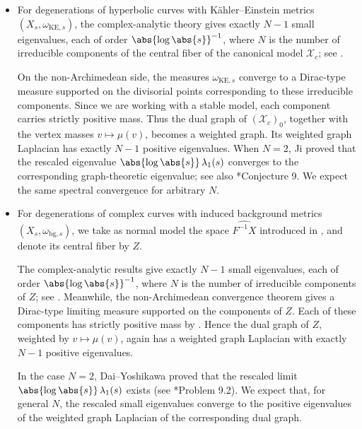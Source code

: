 \documentclass[12pt]{amsart}
\begin{document}
\begin{itemize}
    \item
    For degenerations of hyperbolic curves with K\"ahler--Einstein
    metrics $(X_s,\omega_{\mathrm{KE},s})$, the complex-analytic theory
    gives exactly $N-1$ small eigenvalues, each of order
    $\abs{\log\abs{s}}^{-1}$, where $N$ is the number of irreducible
    components of the central fiber of the canonical model
    $\mathcal{X}_c$; see .

    On the non-Archimedean side, the measures
    $\omega_{\mathrm{KE},s}$ converge to a Dirac-type measure supported
    on the divisorial points corresponding to these irreducible
    components. Since we are working with a stable model, each component
    carries strictly positive mass. Thus the dual graph of
    $(\mathcal{X}_c)_0$, together with the vertex masses
    $v \mapsto \mu(v)$, becomes a weighted graph. Its weighted graph
    Laplacian has exactly $N-1$ positive eigenvalues. When $N=2$, Ji
    \cite{Ji1993} proved that the rescaled eigenvalue
    $\abs{\log\abs{s}}\,\lambda_1(s)$ converges to the corresponding
    graph-theoretic eigenvalue; see also
    \cite{Grotowski-Huntley-Jorgenson2001}*{Conjecture 9}. We expect
    the same spectral convergence for arbitrary $N$.

    \item
    For degenerations of complex curves with induced background metrics
    $(X_s,\omega_{\mathrm{bg},s})$, we take as normal model the space
    $\widehat{F^{-1}X}$ introduced in , and
    denote its central fiber by $Z$.

    The complex-analytic results give exactly $N-1$ small eigenvalues,
    each of order $\abs{\log\abs{s}}^{-1}$, where $N$ is the number of
    irreducible components of $Z$; see .
    Meanwhile, the non-Archimedean convergence theorem gives a
    Dirac-type limiting measure supported on the components of $Z$.
    Each of these components has strictly positive mass by
    . Hence the dual graph of $Z$,
    weighted by $v \mapsto \mu(v)$, again has a weighted graph
    Laplacian with exactly $N-1$ positive eigenvalues.

    In the case $N=2$, Dai--Yoshikawa proved that 
    the
    rescaled limit 
    $\abs{\log\abs{s}}\,\lambda_1(s)$ exists (see 
    \cite{Dai-Yoshikawa2025}*{Problem 9.2}). We expect that, for general
    $N$, the rescaled small eigenvalues converge to the positive
    eigenvalues of the weighted graph Laplacian of the corresponding
    dual graph.


\end{itemize}
\end{document}
